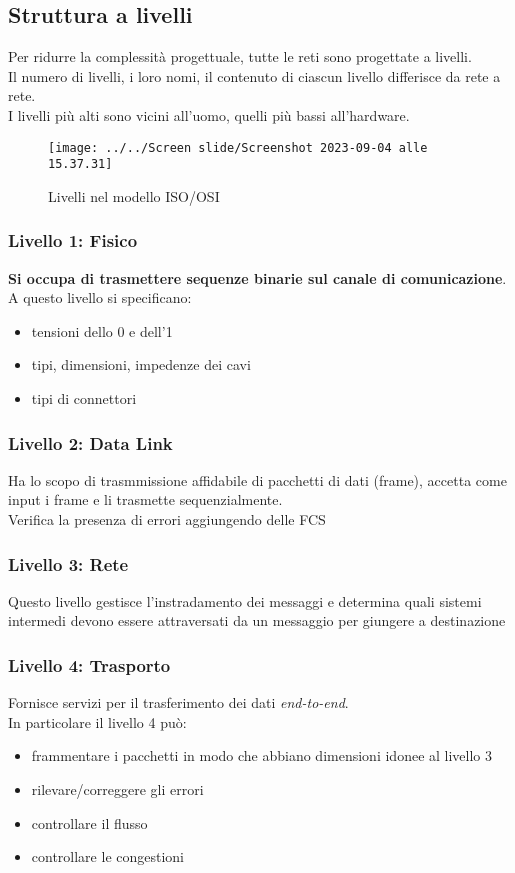 \documentclass[italian,12pt,a4paper]{article}
\begin{document}
\subsection{Struttura a livelli}
Per ridurre la complessità progettuale, tutte le reti sono progettate a livelli.\\
Il numero di livelli, i loro nomi, il contenuto di ciascun livello differisce da rete a rete.\\
I livelli più alti sono vicini all'uomo, quelli più bassi all'hardware.
\begin{figure}[h!]
	\centering
	\texttt{[image: ../../Screen slide/Screenshot 2023-09-04 alle 15.37.31]}
	\caption{Livelli nel modello ISO/OSI}
\end{figure}
\subsubsection{Livello 1: Fisico}
\textbf{Si occupa di trasmettere sequenze binarie sul canale di comunicazione}.\\
A questo livello si specificano:
\begin{itemize}
	\item tensioni dello 0 e dell'1
	\item tipi, dimensioni, impedenze dei cavi
	\item tipi di connettori
\end{itemize}
\subsubsection{Livello 2: Data Link}
Ha lo scopo di trasmmissione affidabile di pacchetti di dati (frame), accetta come input i frame e li trasmette sequenzialmente.\\
Verifica la presenza di errori aggiungendo delle FCS
\subsubsection{Livello 3: Rete}
Questo livello gestisce l'instradamento dei messaggi e determina quali sistemi intermedi devono essere attraversati da un messaggio per giungere a destinazione
\subsubsection{Livello 4: Trasporto}
Fornisce servizi per il trasferimento dei dati \textit{end-to-end}.\\
In particolare il livello 4 può:
\begin{itemize}
	\item frammentare i pacchetti in modo che abbiano dimensioni idonee al livello 3
	\item rilevare/correggere gli errori
	\item controllare il flusso
	\item controllare le congestioni
\end{itemize}
\end{document}
